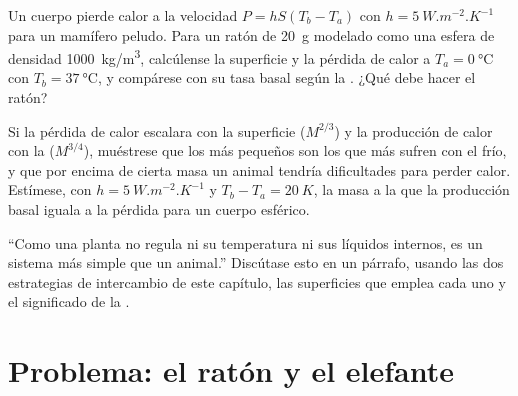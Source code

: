 \begin{exercise}[$\star\star\star$]\label{exo:b1:organism-environment:10}
Un cuerpo pierde calor a la velocidad $P = hS(T_b - T_a)$ con
$h = \qty{5}{W.m^{-2}.K^{-1}}$ para un mamífero peludo. Para un ratón de
\qty{20}{g} modelado como una esfera de densidad \qty{1000}{kg/m^3},
calcúlense la superficie y la pérdida de calor a $T_a = \qty{0}{\celsius}$
con $T_b =
\qty{37}{\celsius}$, y compárese con su tasa basal según la .
¿Qué debe hacer el ratón?
\end{exercise}

\begin{exercise}[$\star\star\star$]\label{exo:b1:organism-environment:11}
Si la pérdida de calor escalara con la superficie ($M^{2/3}$) y la
producción de calor con la  ($M^{3/4}$), muéstrese que los
 más pequeños son los que más sufren con el frío, y que por encima
de cierta masa un animal tendría dificultades para perder calor. Estímese,
con $h = \qty{5}{W.m^{-2}.K^{-1}}$ y $T_b - T_a = \qty{20}{K}$, la masa a la
que la producción basal iguala a la pérdida para un cuerpo esférico.
\end{exercise}

\begin{exercise}[$\star\star\star$]\label{exo:b1:organism-environment:12}
``Como una planta no regula ni su temperatura ni sus líquidos internos, es un
sistema más simple que un animal.'' Discútase esto en un párrafo, usando las
dos estrategias de intercambio de este capítulo, las superficies que emplea
cada uno y el significado de la .
\end{exercise}

\section{Problema: el ratón y el elefante}

